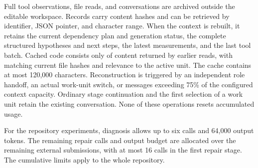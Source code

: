 Full tool observations, file reads, and conversations are archived outside the editable workspace. Records carry content hashes and can be retrieved by identifier, JSON pointer, and character range. When the context is rebuilt, it retains the current dependency plan and generation status, the complete structured hypotheses and next steps, the latest measurements, and the last tool batch. Cached code consists only of content returned by earlier reads, with matching current file hashes and relevance to the active unit. The cache contains at most 120,000 characters. Reconstruction is triggered by an independent role handoff, an actual work-unit switch, or messages exceeding 75\% of the configured context capacity. Ordinary stage continuation and the first selection of a work unit retain the existing conversation. None of these operations resets accumulated usage.

For the repository experiments, diagnosis allows up to six calls and 64,000 output tokens. The remaining repair calls and output budget are allocated over the remaining external submissions, with at most 16 calls in the first repair stage. The cumulative limits apply to the whole repository.
